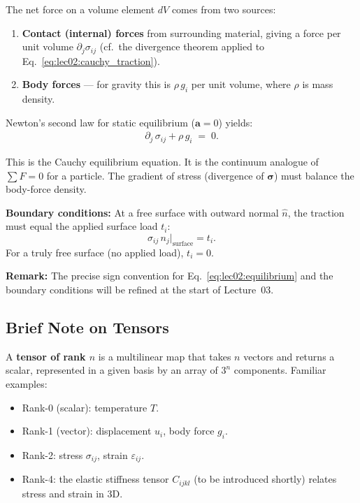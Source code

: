 The net force on a volume element $dV$ comes from two sources:
\begin{enumerate}
    \item \textbf{Contact (internal) forces} from surrounding material,
          giving a force per unit volume $\partial_j\sigma_{ij}$
          (cf.\ the divergence theorem applied to
          Eq.~\eqref{eq:lec02:cauchy_traction}).
    \item \textbf{Body forces} — for gravity this is
          $\rho\,g_i$ per unit volume, where $\rho$ is mass density.
\end{enumerate}

Newton's second law for static equilibrium ($\mathbf{a}=0$) yields:
\begin{align}
    \boxed{\partial_j\,\sigma_{ij} + \rho\,g_i \;=\; 0}.
    \label{eq:lec02:equilibrium}
\end{align}

This is the Cauchy equilibrium equation.  It is the continuum analogue of
$\sum F = 0$ for a particle.  The gradient of stress (divergence of
$\bm{\sigma}$) must balance the body-force density.

\textbf{Boundary conditions:}  At a free surface with outward normal
$\hat{n}$, the traction must equal the applied surface load $t_i$:
\[
    \sigma_{ij}\,n_j \Big|_{\text{surface}} = t_i.
\]
For a truly free surface (no applied load), $t_i = 0$.

\textbf{Remark:}  The precise sign convention for Eq.~\eqref{eq:lec02:equilibrium}
and the boundary conditions will be refined at the start of Lecture~03.

\subsection{Brief Note on Tensors}
\label{subsec:lec02:tensors}

A \textbf{tensor of rank $n$} is a multilinear map that takes $n$ vectors
and returns a scalar, represented in a given basis by an array of
$3^n$ components.  Familiar examples:
\begin{itemize}
    \item Rank-0 (scalar): temperature $T$.
    \item Rank-1 (vector): displacement $u_i$, body force $g_i$.
    \item Rank-2: stress $\sigma_{ij}$, strain $\varepsilon_{ij}$.
    \item Rank-4: the elastic stiffness tensor $C_{ijkl}$  
          (to be introduced shortly) relates stress and strain in 3D.
\end{itemize}

